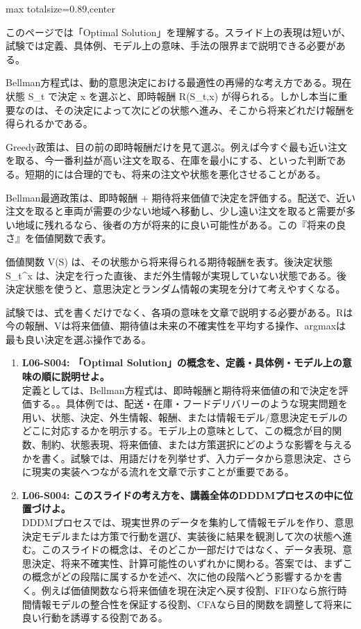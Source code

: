 \begin{minipage}[t]{0.58\textwidth}
\begin{adjustbox}{max totalsize={\textwidth}{0.89\textheight},center}
\begin{minipage}{\textwidth}\scriptsize
{}このページでは「Optimal Solution」を理解する。スライド上の表現は短いが、試験では定義、具体例、モデル上の意味、手法の限界まで説明できる必要がある。\par
Bellman方程式は、動的意思決定における最適性の再帰的な考え方である。現在状態 S\_t で決定 x を選ぶと、即時報酬 R(S\_t,x) が得られる。しかし本当に重要なのは、その決定によって次にどの状態へ進み、そこから将来どれだけ報酬を得られるかである。\par
Greedy政策は、目の前の即時報酬だけを見て選ぶ。例えば今すぐ最も近い注文を取る、今一番利益が高い注文を取る、在庫を最小にする、といった判断である。短期的には合理的でも、将来の注文や状態を悪化させることがある。\par
Bellman最適政策は、即時報酬 + 期待将来価値で決定を評価する。配送で、近い注文を取ると車両が需要の少ない地域へ移動し、少し遠い注文を取ると需要が多い地域に残れるなら、後者の方が将来的に良い可能性がある。この『将来の良さ』を価値関数で表す。\par
価値関数 V(S) は、その状態から将来得られる期待報酬を表す。後決定状態 S\_t\textasciicircum{}x は、決定を行った直後、まだ外生情報が実現していない状態である。後決定状態を使うと、意思決定とランダム情報の実現を分けて考えやすくなる。\par
試験では、式を書くだけでなく、各項の意味を文章で説明する必要がある。Rは今の報酬、Vは将来価値、期待値は未来の不確実性を平均する操作、argmaxは最も良い決定を選ぶ操作である。\par{}\begin{enumerate}\item \textbf{L06-S004: 「Optimal Solution」の概念を、定義・具体例・モデル上の意味の順に説明せよ。}\\定義としては、Bellman方程式は、即時報酬と期待将来価値の和で決定を評価する。。具体例では、配送・在庫・フードデリバリーのような現実問題を用い、状態、決定、外生情報、報酬、または情報モデル/意思決定モデルのどこに対応するかを明示する。モデル上の意味として、この概念が目的関数、制約、状態表現、将来価値、または方策選択にどのような影響を与えるかを書く。試験では、用語だけを列挙せず、入力データから意思決定、さらに現実の実装へつながる流れを文章で示すことが重要である。\item \textbf{L06-S004: このスライドの考え方を、講義全体のDDDMプロセスの中に位置づけよ。}\\DDDMプロセスでは、現実世界のデータを集約して情報モデルを作り、意思決定モデルまたは方策で行動を選び、実装後に結果を観測して次の状態へ進む。このスライドの概念は、そのどこか一部だけではなく、データ表現、意思決定、将来不確実性、計算可能性のいずれかに関わる。答案では、まずこの概念がどの段階に属するかを述べ、次に他の段階へどう影響するかを書く。例えば価値関数なら将来価値を現在決定へ戻す役割、FIFOなら旅行時間情報モデルの整合性を保証する役割、CFAなら目的関数を調整して将来に良い行動を誘導する役割である。\end{enumerate}

\end{minipage}
\end{adjustbox}
\end{minipage}
